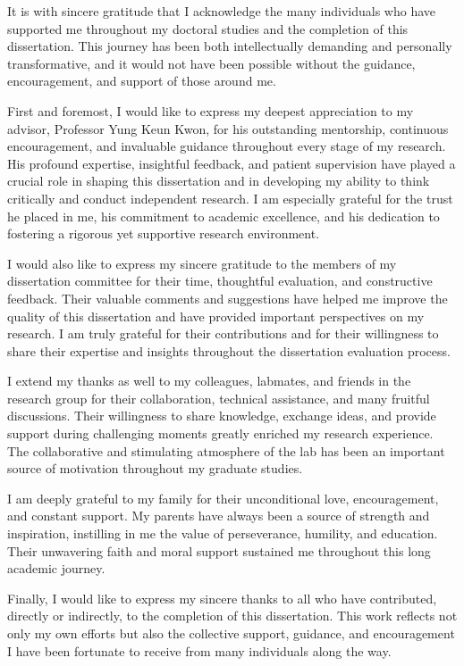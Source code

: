 \documentclass[
12pt, %
english, %
singlespacing, %
headsepline, %
]{MastersDoctoralThesis} %
\begin{document}
\begin{acknowledgements}
\addchaptertocentry{\acknowledgementname} %
It is with sincere gratitude that I acknowledge the many individuals who have supported me throughout my doctoral studies and the completion of this dissertation. This journey has been both intellectually demanding and personally transformative, and it would not have been possible without the guidance, encouragement, and support of those around me.

First and foremost, I would like to express my deepest appreciation to my advisor, Professor Yung Keun Kwon, for his outstanding mentorship, continuous encouragement, and invaluable guidance throughout every stage of my research. His profound expertise, insightful feedback, and patient supervision have played a crucial role in shaping this dissertation and in developing my ability to think critically and conduct independent research. I am especially grateful for the trust he placed in me, his commitment to academic excellence, and his dedication to fostering a rigorous yet supportive research environment.

I would also like to express my sincere gratitude to the members of my dissertation committee for their time, thoughtful evaluation, and constructive feedback. Their valuable comments and suggestions have helped me improve the quality of this dissertation and have provided important perspectives on my research. I am truly grateful for their contributions and for their willingness to share their expertise and insights throughout the dissertation evaluation process.

I extend my thanks as well to my colleagues, labmates, and friends in the research group for their collaboration, technical assistance, and many fruitful discussions. Their willingness to share knowledge, exchange ideas, and provide support during challenging moments greatly enriched my research experience. The collaborative and stimulating atmosphere of the lab has been an important source of motivation throughout my graduate studies.

I am deeply grateful to my family for their unconditional love, encouragement, and constant support. My parents have always been a source of strength and inspiration, instilling in me the value of perseverance, humility, and education. Their unwavering faith and moral support sustained me throughout this long academic journey.

Finally, I would like to express my sincere thanks to all who have contributed, directly or indirectly, to the completion of this dissertation. This work reflects not only my own efforts but also the collective support, guidance, and encouragement I have been fortunate to receive from many individuals along the way.
\end{acknowledgements}
\end{document}
